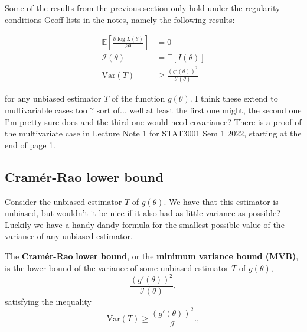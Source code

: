 
Some of the results from the previous section only hold under the regularity conditions Geoff lists in the notes, namely the following results:

\begin{align*}
    \mathbb{E}\left[\frac{\partial \log L(\theta)}{\partial \theta}\right] &= 0\\
    \mathscr{I}(\theta) &= \mathbb{E}[I(\theta)]\\
    \text{Var}(T) &\geq \frac{(g'(\theta))^2}{\mathscr{I}(\theta)}
\end{align*}

for any unbiased estimator \(T\) of the function \(g(\theta)\). 
I think these extend to multivariable cases too ? sort of... well at least the first one might, the second one I'm pretty sure does and the third one would need covariance?
There is a proof of the multivariate case in Lecture Note 1 for STAT3001 Sem 1 2022, starting at the end of page 1.

\subsection{Cram\'{e}r-Rao lower bound}\label{subsec:Cramer-Rao}

Consider the unbiased estimator \(T\) of \(g(\theta)\). 
We have that this estimator is unbiased, but wouldn't it be nice if it also had as little variance as possible?
Luckily we have a handy dandy formula for the smallest possible value of the variance of any unbiased estimator.

\begin{definition}\label{defn:cramer}
    The \textbf{Cram\'{e}r-Rao} \textbf{lower bound}, or the \textbf{minimum variance bound (MVB)}, is the lower bound of the variance of some unbiased estimator \(T\) of \(g(\theta)\), 
    \begin{equation}\label{eq:MVB}
        \frac{\left(g'(\theta)\right)^2}{\mathscr{I}(\theta)},
    \end{equation}
    satisfying the inequality 
    \begin{equation}\label{eq:MVB inequality}
        \text{Var}(T) \geq \frac{\left(g'(\theta)\right)^2}{\mathscr{I}}.,
    \end{equation}
\end{definition}

